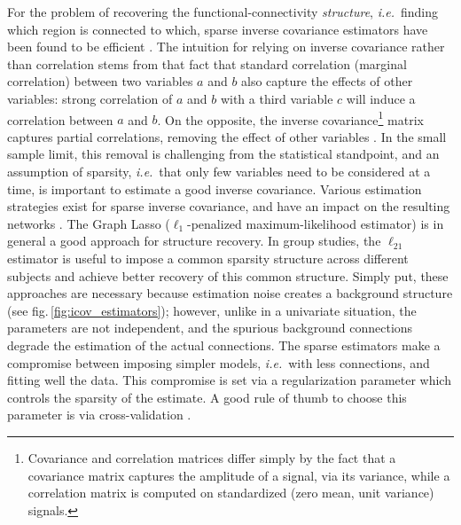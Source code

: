\documentclass[5p]{elsarticle}
\begin{document}
For the problem of recovering the functional-connectivity
\emph{structure}, \emph{i.e.}\ finding which region is connected to
which, sparse inverse covariance estimators have been found to be
efficient \cite{varoquaux2010c, ryali2011, smith2011}. The intuition for relying on
inverse covariance rather than correlation stems from that fact that
standard correlation (marginal correlation) between two variables $a$ and
$b$ also capture the effects of other variables: strong correlation of
$a$ and $b$ with a third variable $c$ will induce a correlation between
$a$ and $b$. On the opposite, the inverse covariance\footnote{Covariance
and correlation matrices differ simply by the fact that a covariance
matrix captures the amplitude of a signal, via its variance, while a
correlation matrix is computed on standardized (zero mean, unit variance) signals.}
matrix captures
partial correlations, removing the effect of other variables
\cite{marrelec2006a}. In the small sample limit, this removal is
challenging from the statistical standpoint, and an assumption of sparsity,
\emph{i.e.}\ that only few variables need to be considered at a time, is
important to estimate a good inverse covariance. Various estimation
strategies exist for sparse inverse covariance, and have an impact on the
resulting networks \cite{varoquaux2012,varoquaux2010c}. The
Graph Lasso ($\ell_1$-penalized maximum-likelihood estimator)
\cite{friedman2008} is in general a good approach for structure recovery. In group studies,
the $\ell_{21}$ estimator \cite{varoquaux2010c,honorio2012} is useful to
impose a common sparsity structure across different subjects and achieve
better recovery of this common structure. Simply put, these approaches
are necessary because estimation noise creates a background structure
(see fig.\,\ref{fig:icov_estimators}); however, unlike in a univariate situation, the
parameters are not independent, and the spurious background connections
degrade the estimation of the actual connections. The sparse estimators
make a compromise between imposing simpler models, \emph{i.e.}\ with less
connections, and fitting well the data. This compromise is set via a
regularization parameter which controls the sparsity of the estimate. A
good rule of thumb to choose this parameter is via cross-validation
\cite{varoquaux2010c}.

\end{document}
